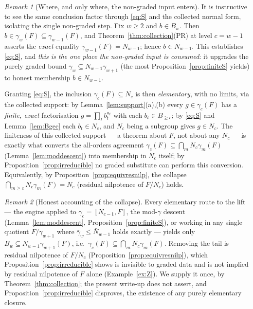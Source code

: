 \documentclass{amsart}
\theoremstyle{definition}
\theoremstyle{remark}
\newtheorem{remark}{Remark}
\begin{document}
\begin{remark}[Where, and only where, the non-graded input enters]\label{rem:onestep}
It is instructive to see the same conclusion factor through \eqref{eq:S} and the collected normal
form, isolating the single non-graded step. Fix $w\ge2$ and $b\in B_w$. Then $b\in\gamma_w(F)
\subseteq\gamma_{w-1}(F)$, and Theorem~\ref{thm:collection}(PR) at level $c=w-1$ asserts the
\emph{exact} equality $\gamma_{w-1}(F)=N_{w-1}$; hence $b\in N_{w-1}$. This establishes
\eqref{eq:S}, and \emph{this is the one place the non-graded input is consumed}: it upgrades the
purely graded bound $\gamma_w\subseteq N_{w-1}\gamma_{w+1}$ (the most
Proposition~\ref{prop:finiteS} yields) to honest membership $b\in N_{w-1}$.

Granting \eqref{eq:S}, the inclusion $\gamma_c(F)\subseteq N_c$ is then \emph{elementary}, with no
limits, via the collected support: by Lemma~\ref{lem:support}(a),(b) every $g\in\gamma_c(F)$ has a
\emph{finite, exact} factorisation $g=\prod_t b_t^{a_t}$ with each $b_t\in B_{\ge c}$; by
\eqref{eq:S} and Lemma~\ref{lem:Bgec} each $b_t\in N_c$, and $N_c$ being a subgroup gives $g\in
N_c$. The finiteness of this collected support --- a theorem about $F$, not about any $N_c$ ---
is exactly what converts the all-orders agreement $\gamma_c(F)\subseteq\bigcap_m N_c\gamma_m(F)$
(Lemma~\ref{lem:moddescent}) into membership in $N_c$ itself; by
Proposition~\ref{prop:irreducible} no graded substitute can perform this conversion.
Equivalently, by Proposition~\ref{prop:equivresnilp}, the collapse
$\bigcap_{m\ge c}N_c\gamma_m(F)=N_c$ \textup{(}residual nilpotence of $F/N_c$\textup{)} holds.
\end{remark}

\begin{remark}[Honest accounting of the collapse]\label{rem:where}
Every elementary route to the lift --- the engine applied to $\gamma_c=[N_{c-1},F]$, the
mod-$\gamma$ descent (Lemma~\ref{lem:moddescent}, Proposition~\ref{prop:finiteS}), or working in
any single quotient $F/\gamma_{w+1}$ where $\bar\gamma_w\le\bar N_{w-1}$ holds exactly --- yields
only $B_w\subseteq N_{w-1}\gamma_{w+1}(F)$, i.e.\ $\gamma_c(F)\subseteq\bigcap_m N_c\gamma_m(F)$.
Removing the tail is residual nilpotence of $F/N_c$ (Proposition~\ref{prop:equivresnilp}), which
Proposition~\ref{prop:irreducible} shows is invisible to graded data and is not implied by
residual nilpotence of $F$ alone (Example~\ref{ex:Z}). We supply it once, by
Theorem~\ref{thm:collection}; the present write-up does not assert, and
Proposition~\ref{prop:irreducible} disproves, the existence of any purely elementary closure.
\end{remark}
\end{document}
